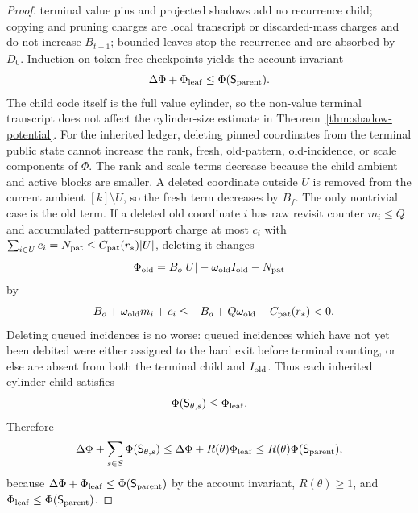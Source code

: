 \documentclass[11pt]{article}
\begin{document}
\begin{proof}
terminal value pins and projected shadows add no recurrence child; copying and
pruning charges are local transcript or discarded-mass charges and do not
increase $B_{t+1}$; bounded leaves stop the recurrence and are absorbed by
$D_0$.  Induction on token-free checkpoints yields the account invariant
\[
  \Delta\Phi+\Phi_{\rm leaf}\le \Phi(\mathsf S_{\rm parent}).
\]
The child code itself is the full value cylinder, so the non-value terminal
transcript does not affect the cylinder-size estimate in
Theorem~\ref{thm:shadow-potential}.  For the inherited ledger, deleting pinned
coordinates from the terminal public state cannot increase the rank, fresh,
old-pattern, old-incidence, or scale components of $\Phi$.  The rank and scale terms decrease
because the child ambient and active blocks are smaller.  A
deleted coordinate outside $U$ is removed from the current ambient
$[k]\setminus U$, so the fresh term decreases by $B_f$.  The only nontrivial
case is the old term.  If a deleted old coordinate $i$ has raw revisit counter
$m_i\le Q$ and accumulated pattern-support charge at most $c_i$ with
$\sum_{i\in U}c_i=N_{\rm pat}\le C_{\rm pat}(r_*)|U|$, deleting it changes
\[
  \Phi_{\rm old}=B_o|U|-\omega_{\rm old}I_{\rm old}-N_{\rm pat}
\]
by
\[
  -B_o+\omega_{\rm old}m_i+c_i
  \le -B_o+Q\omega_{\rm old}+C_{\rm pat}(r_*)<0.
\]
Deleting queued incidences is no worse: queued incidences which have not yet
been debited were either assigned to the hard exit before terminal counting, or
else are absent from both the terminal child and $I_{\rm old}$.  Thus each
inherited cylinder child satisfies
\[
  \Phi(\mathsf S_{\theta,s})\le \Phi_{\rm leaf}.
\]
Therefore
\[
  \Delta\Phi+\sum_{s\in S}\Phi(\mathsf S_{\theta,s})
  \le
  \Delta\Phi+R(\theta)\Phi_{\rm leaf}
  \le
  R(\theta)\Phi(\mathsf S_{\rm parent}),
\]
because $\Delta\Phi+\Phi_{\rm leaf}\le\Phi(\mathsf S_{\rm parent})$ by the
account invariant, $R(\theta)\ge1$, and
$\Phi_{\rm leaf}\le\Phi(\mathsf S_{\rm parent})$.
\end{proof}
\end{document}
